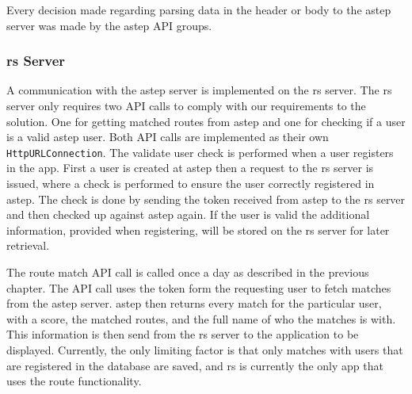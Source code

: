 Every decision made regarding parsing data in the header or body to the \gls{astep} server was made by the \gls{astep} API groups.

\subsubsection{\gls{rs} Server}
A communication with the \gls{astep} server is implemented on the \gls{rs} server.
The \gls{rs} server only requires two API calls to comply with our requirements to the solution.
One for getting matched routes from \gls{astep} and one for checking if a user is a valid \gls{astep} user.
Both API calls are implemented as their own \texttt{HttpURLConnection}.
The validate user check is performed when a user registers in the app. 
First a user is created at \gls{astep} then a request to the \gls{rs} server is issued, where a check is performed to ensure the user correctly registered in \gls{astep}.
The check is done by sending the token received from \gls{astep} to the \gls{rs} server and then checked up against \gls{astep} again.
If the user is valid the additional information, provided when registering, will be stored on the \gls{rs} server for later retrieval. 

The route match API call is called once a day as described in the previous chapter.
The API call uses the token form the requesting user to fetch matches from the \gls{astep} server. 
\gls{astep} then returns every match for the particular user, with a score, the matched routes, and the full name of who the matches is with.
This information is then send from the \gls{rs} server to the application to be displayed.
Currently, the only limiting factor is that only matches with users that are registered in the database are saved, and \gls{rs} is currently the only app that uses the route functionality.
